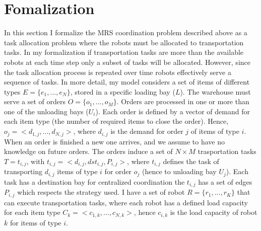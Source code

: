 \section{Fomalization}
In this section I formalize the MRS coordination problem described above as a task allocation problem
where the robots must be allocated to transportation tasks. In my formalization if 
transportation tasks are more than the available robots at each time step only a subset 
of tasks will be allocated. However, since the task allocation process is repeated over time robots 
effectively serve a sequence of tasks. 
In more detail, my model considers a set of items of different types $E = \{ e_1,...,e_N\}$,
stored in a specific loading bay ($L$). The warehouse must serve a set of orders 
$O=\{o_1,...,o_M\}$. Orders are processed in one or more than one of the unloading bays ($U_i$).
Each order is defined by a vector of demand for each item type (the number of required 
items to close the order). Hence, $o_j = < d_{1,j},...,d_{N,j}>$, where $d_{i,j}$ is the 
demand for order $j$ of items of type $i$. When an order is finished a new one arrives,
and we assume to have no knowledge on future orders.
The orders induce a set of $N \times M$ trasportation tasks $T = {t_{i,j}}$, with 
$t_{i,j} = < d_{i,j}, dst_{i,j}, P_{i,j}>$, where $t_{i,j}$ defines the task of transporting 
$d_{i,j}$ items of type $i$ for order $o_j$ (hence to unloading bay $U_j$).
Each task has a destination bay for centralized coordination the $t_{i,j}$ has a set of edges
$P_{i,j}$ which respects the strategy used. 
I have a set of robot $R = \{r_1,...,r_K \}$ that can execute transportation tasks, where
each robot has a defined load capacity for each item type $C_k = <c_{1,k},...,c_{N,k}>$, 
hence $c_{i,k}$ is the load capacity of robot $k$ for items of type $i$. 


%
%

